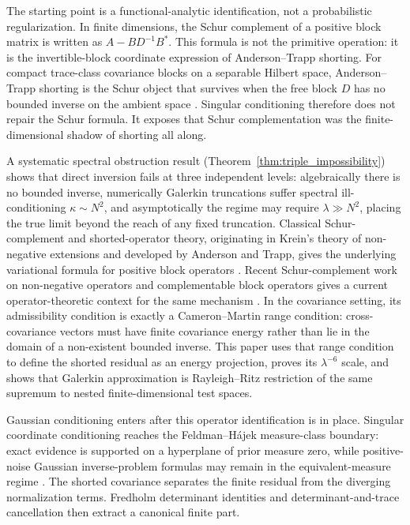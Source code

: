 \documentclass[preprint,12pt]{elsarticle}
\theoremstyle{plain}
\theoremstyle{definition}
\theoremstyle{remark}
\begin{document}
    The starting point is a functional-analytic identification, not a
    probabilistic regularization.  In finite dimensions, the Schur complement
    of a positive block matrix is written as $A-BD^{-1}B^*$.  This formula is
    not the primitive operation: it is the invertible-block coordinate
    expression of Anderson--Trapp shorting.  For compact trace-class covariance
    blocks on a separable Hilbert space, Anderson--Trapp shorting is the Schur
    object that survives when the free block $D$ has no bounded inverse on the
    ambient space
    \cite{bogachev1998gaussian,simon2005trace,daprato2014stochastic,jorgensentian2024hilbert}.  Singular
    conditioning therefore does not repair the Schur formula.  It exposes that
    Schur complementation was the finite-dimensional shadow of shorting all
    along.

    A systematic spectral obstruction result
    (Theorem~\ref{thm:triple_impossibility}) shows that direct inversion fails
    at three independent levels: algebraically there is no bounded inverse,
    numerically Galerkin truncations suffer spectral ill-conditioning
    $\kappa\sim N^{2}$, and asymptotically the regime may require
    $\lambda\gg N^{2}$, placing the true limit beyond the reach of any fixed
    truncation.  Classical Schur-complement and shorted-operator theory,
    originating in Krein's theory of non-negative extensions and developed by
    Anderson and Trapp, gives the underlying variational formula for positive
    block operators
    \cite{krein1947selfadjoint,anderson1975shorted,douglas1966majorization}.
    Recent Schur-complement work on non-negative operators and complementable
    block operators gives a current operator-theoretic context for the same
    mechanism \cite{contino2021matrix,naikjohnson2024complementable}.
    In the covariance setting, its admissibility condition is exactly a
    Cameron--Martin range condition: cross-covariance vectors must have finite
    covariance energy rather than lie in the domain of a non-existent bounded
    inverse.  This paper uses that range condition to define the shorted
    residual as an energy projection, proves its $\lambda^{-6}$ scale, and
    shows that Galerkin approximation is Rayleigh--Ritz restriction of the same
    supremum to nested finite-dimensional test spaces.

    Gaussian conditioning enters after this operator identification is in
    place.  Singular coordinate conditioning reaches the Feldman--H\'{a}jek
    measure-class boundary: exact evidence is supported on a hyperplane of
    prior measure zero, while positive-noise Gaussian inverse-problem formulas may remain in
    the equivalent-measure regime
    \cite{feldman1958equivalence,hajek1958property,bogachev1998gaussian,stuart2010inverse,carerelie2024covariance,carerelie2025mean}.
    The shorted covariance separates the finite residual from the diverging
    normalization terms.  Fredholm determinant identities and
    determinant-and-trace cancellation then extract a canonical finite part.
\end{document}
